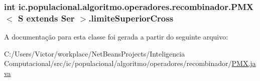 \hypertarget{classic_1_1populacional_1_1algoritmo_1_1operadores_1_1recombinador_1_1_p_m_x_3_01_s_01extends_01_ser_01_4_ab3e6575836e6b19fa425076b30e90d70}{
\subsubsection[{limite\-Superior\-Cross}]{\setlength{\rightskip}{0pt plus 5cm}int ic.\-populacional.\-algoritmo.\-operadores.\-recombinador.\-P\-M\-X$<$ S extends Ser $>$.limite\-Superior\-Cross\hspace{0.3cm}{\ttfamily [private]}}}\label{classic_1_1populacional_1_1algoritmo_1_1operadores_1_1recombinador_1_1_p_m_x_3_01_s_01extends_01_ser_01_4_ab3e6575836e6b19fa425076b30e90d70}


A documentação para esta classe foi gerada a partir do seguinte arquivo\-:\begin{DoxyCompactItemize}
\item 
C\-:/\-Users/\-Victor/workplace/\-Net\-Beans\-Projects/\-Inteligencia Computacional/src/ic/populacional/algoritmo/operadores/recombinador/\hyperlink{_p_m_x_8java}{P\-M\-X.\-java}\end{DoxyCompactItemize}
